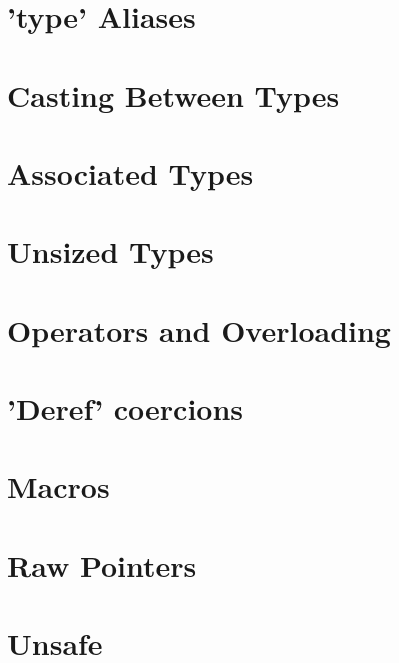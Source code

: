 \section{'type' Aliases}
\label{sec:syntax_typeAliases}


\section{Casting Between Types}
\label{sec:syntax_casting}


\section{Associated Types}
\label{sec:syntax_associatedTypes}


\section{Unsized Types}
\label{sec:syntax_unsizedTypes}


\section{Operators and Overloading}
\label{sec:syntax_operatorsAndOverloading}


\section{'Deref' coercions}
\label{sec:syntax_derefCoercions}


\section{Macros}
\label{sec:syntax_macros}


\section{Raw Pointers}
\label{sec:syntax_rawPointers}


\section{Unsafe}
\label{sec:syntax_unsafe}

